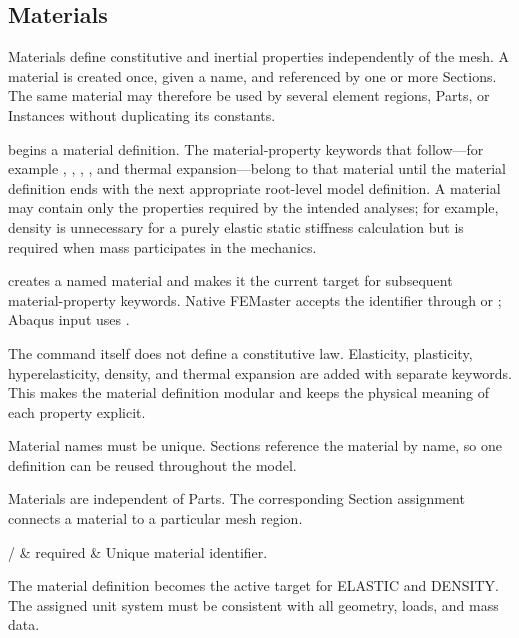 \subsection{Materials}
\label{sec:materials}

Materials define constitutive and inertial properties independently of the mesh. A material is created once, given a name, and referenced by one or more Sections. The same material may therefore be used by several element regions, Parts, or Instances without duplicating its constants.

 begins a material definition. The material-property keywords that follow---for example , , , , and thermal expansion---belong to that material until the material definition ends with the next appropriate root-level model definition. A material may contain only the properties required by the intended analyses; for example, density is unnecessary for a purely elastic static stiffness calculation but is required when mass participates in the mechanics.


 creates a named material and makes it the current target for subsequent material-property keywords. Native FEMaster accepts the identifier through  or ; Abaqus input uses .

The command itself does not define a constitutive law. Elasticity, plasticity, hyperelasticity, density, and thermal expansion are added with separate keywords. This makes the material definition modular and keeps the physical meaning of each property explicit.

Material names must be unique. Sections reference the material by name, so one definition can be reused throughout the model.

Materials are independent of Parts. The corresponding Section assignment connects a material to a particular mesh region.

\begin{keywordparameters}
 /  & required & Unique material identifier. \\
\end{keywordparameters}

The material definition becomes the active target for ELASTIC and DENSITY. The assigned unit system must be consistent with all geometry, loads, and mass data.

\exampleheading

